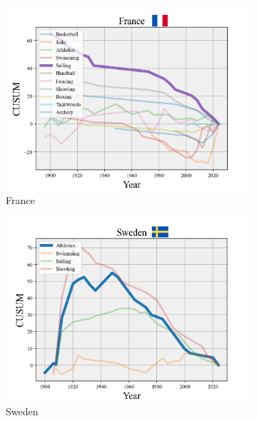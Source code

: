 \documentclass[12pt]{article}  %
\begin{document}
\begin{figure}[H]
	\centering
	\begin{subfigure}[b]{.32\textwidth}
		\includegraphics[width=\textwidth]{img/Decline1.png}
		\caption{France}\label{subfig:1}
	\end{subfigure}
	\hfill 
	\begin{subfigure}[b]{.32\textwidth}
		\includegraphics[width=\textwidth]{img/Decline2.png}
		\caption{Sweden}\label{subfig:2}
	\end{subfigure}
	\hfill 
	\begin{subfigure}[b]{.32\textwidth}

\end{subfigure}
\end{figure}
\end{document}

